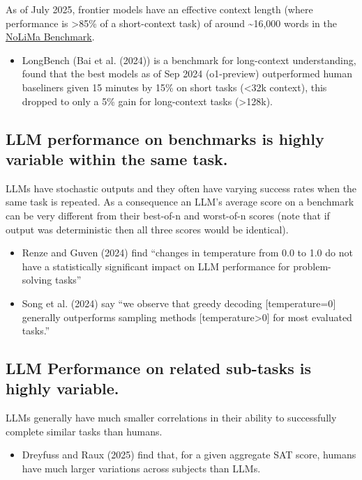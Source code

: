 \documentclass[
  letterpaper,
  DIV=11,
  numbers=noendperiod,
  oneside]{scrartcl}
\providecommand{\tightlist}{%
  \setlength{\itemsep}{0pt}\setlength{\parskip}{0pt}}
\begin{document}
As of July 2025, frontier models have an effective context length (where
performance is \textgreater85\% of a short-context task) of around
\textasciitilde16,000 words in the
\href{https://github.com/adobe-research/NoLiMa}{NoLiMa Benchmark}.

\begin{itemize}
\tightlist
\item
  LongBench (Bai et al. (2024)) is a benchmark for long-context
  understanding, found that the best models as of Sep 2024 (o1-preview)
  outperformed human baseliners given 15 minutes by 15\% on short tasks
  (\textless32k context), this dropped to only a 5\% gain for
  long-context tasks (\textgreater128k).
\end{itemize}

\subsection{LLM performance on benchmarks is highly variable within the
same
task.}\label{llm-performance-on-benchmarks-is-highly-variable-within-the-same-task.}

LLMs have stochastic outputs and they often have varying success rates
when the same task is repeated. As a consequence an LLM's average score
on a benchmark can be very different from their best-of-n and worst-of-n
scores (note that if output was deterministic then all three scores
would be identical).

\begin{itemize}
\item
  Renze and Guven (2024) find ``changes in temperature from 0.0 to 1.0
  do not have a statistically significant impact on LLM performance for
  problem-solving tasks''
\item
  Song et al. (2024) say ``we observe that greedy decoding
  {[}temperature=0{]} generally outperforms sampling methods
  {[}temperature\textgreater0{]} for most evaluated tasks.''
\end{itemize}

\subsection{LLM Performance on related sub-tasks is highly
variable.}\label{llm-performance-on-related-sub-tasks-is-highly-variable.}

LLMs generally have much smaller correlations in their ability to
successfully complete similar tasks than humans.

\begin{itemize}
\tightlist
\item
  Dreyfuss and Raux (2025) find that, for a given aggregate SAT score,
  humans have much larger variations across subjects than LLMs.
\end{itemize}
\end{document}
